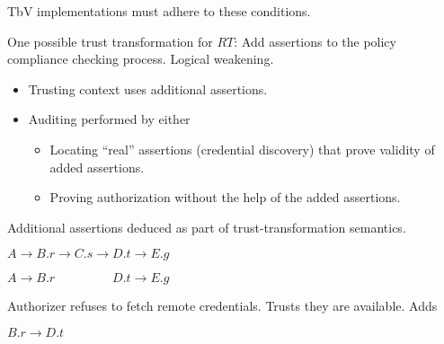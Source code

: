 \documentclass[landscape]{slides}
\newtheorem{condition}{Condition}
\newcommand{\priv}{\mathbf{priv}}
\newcommand{\audit}{\text{audit}}
\newcommand{\cod}[1]{\llbracket#1\rrbracket}
\begin{document}
TbV implementations must adhere to these conditions.
\stopslide


One possible trust transformation for $RT$: Add assertions to the policy compliance checking process. Logical weakening.
\begin{itemize}
\item Trusting context uses additional assertions.
\item Auditing performed by either
  \begin{itemize}
  \item Locating ``real'' assertions (credential discovery) that prove validity of added assertions.
  \item Proving authorization without the help of the added assertions.
  \end{itemize}
\end{itemize}
Additional assertions deduced as part of trust-transformation semantics.
\stopslide


\begin{center}$A \rightarrow B.r \rightarrow C.s \rightarrow D.t \rightarrow E.g$\end{center}

\begin{center}$A \rightarrow B.r\phantom{ \rightarrow C.s \rightarrow }D.t \rightarrow E.g$\end{center}

Authorizer refuses to fetch remote credentials. Trusts they are available. Adds

\begin{center}$B.r \rightarrow D.t$\end{center}
\end{document}
